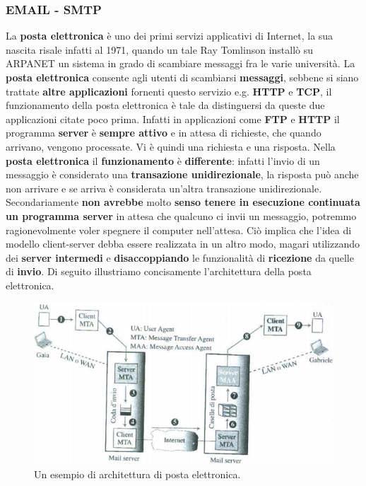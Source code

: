 \documentclass[11pt,a4paper]{article}
\theoremstyle{definition}
\begin{document}
\subsubsection{EMAIL - SMTP}
La \textbf{posta elettronica} è uno dei primi servizi applicativi di Internet, la sua nascita risale infatti al 1971, quando un tale Ray Tomlinson installò su ARPANET un sistema in grado di scambiare messaggi fra le varie università. La \textbf{posta elettronica} consente agli utenti di scambiarsi \textbf{messaggi}, sebbene si siano trattate \textbf{altre applicazioni} fornenti questo servizio e.g. \textbf{HTTP} e \textbf{TCP}, il funzionamento della posta elettronica è tale da distinguersi da queste due applicazioni citate poco prima. Infatti in applicazioni come \textbf{FTP} e \textbf{HTTP} il programma \textbf{server} è \textbf{sempre attivo} e in attesa di richieste, che quando arrivano, vengono processate.
Vi è quindi una richiesta e una risposta. Nella \textbf{posta elettronica} il \textbf{funzionamento} è \textbf{differente}: infatti l'invio di un messaggio è considerato una \textbf{transazione unidirezionale}, la risposta può anche non arrivare e se arriva è considerata un'altra transazione unidirezionale. Secondariamente \textbf{non avrebbe} molto \textbf{senso tenere in esecuzione continuata un programma server} in attesa che qualcuno ci invii un messaggio, potremmo ragionevolmente voler spegnere il computer nell'attesa. Ciò implica che l'idea di modello client-server debba essere realizzata in un altro modo, magari utilizzando dei \textbf{server intermedi} e \textbf{disaccoppiando} le funzionalità di \textbf{ricezione} da quelle di \textbf{invio}. Di seguito illustriamo concisamente l'architettura della posta elettronica.
\begin{figure}[!h]
	\includegraphics[scale=0.5]{Immagini/MAIL.png}
	\centering
	\caption{Un esempio di architettura di posta elettronica.}
\end{figure}\newline
\end{document}
